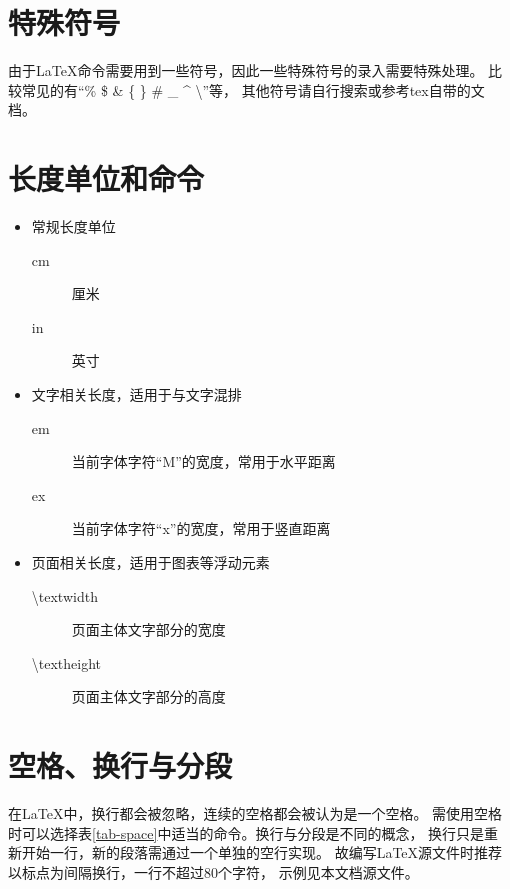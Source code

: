 \section{特殊符号}
\label{sec-symbol}

由于\LaTeX{}命令需要用到一些符号，因此一些特殊符号的录入需要特殊处理。
比较常见的有“\% \$ \& \{ \} \# \_ \^{} \textbackslash”等，
其他符号请自行搜索或参考tex自带的文档。

\section{长度单位和命令}
\label{sec-length}

\begin{itemize}
	\item 常规长度单位
	\begin{description}
		\item[cm] 厘米
		\item[in] 英寸
	\end{description}
	\item 文字相关长度，适用于与文字混排
	\begin{description}
		\item[em] 当前字体字符“M”的宽度，常用于水平距离
		\item[ex] 当前字体字符“x”的宽度，常用于竖直距离
	\end{description}
	\item 页面相关长度，适用于图表等浮动元素
	\begin{description}
		\item[\textbackslash textwidth]  页面主体文字部分的宽度
		\item[\textbackslash textheight] 页面主体文字部分的高度
	\end{description}
\end{itemize}

\section{空格、换行与分段}
\label{sec-space-linkbreak-par}

在\LaTeX{}中，换行都会被忽略，连续的空格都会被认为是一个空格。
需使用空格时可以选择表\ref{tab-space}中适当的命令。换行与分段是不同的概念，
换行只是重新开始一行，新的段落需通过一个单独的空行实现。
故编写\LaTeX{}源文件时推荐以标点为间隔换行，一行不超过80个字符，
示例见本文档源文件。

